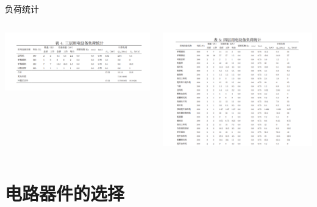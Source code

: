 \documentclass{beamer}
\begin{document}
    \begin{frame}{负荷统计}{\thesection \, \secname}
        \begin{columns}
            \begin{column}{0.4\textwidth}
                \includegraphics[width=\textwidth]{gallery/4.png}
            \end{column}
            \begin{column}{0.4\textwidth}
                \includegraphics[width=\textwidth]{gallery/5.png}
            \end{column}
        \end{columns}
    \end{frame}

    \section{电路器件的选择}
\end{document}
